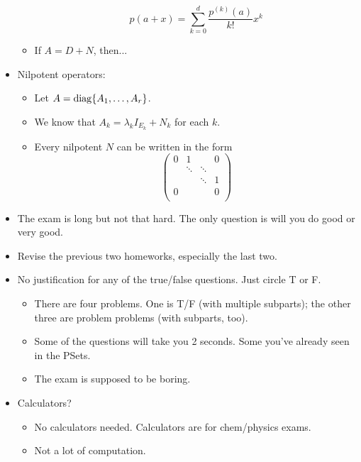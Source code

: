 \documentclass[../../notes.tex]{subfiles}
\begin{document}
\begin{itemize}
\begin{itemize}
        \begin{equation*}
            p(a+x) = \sum_{k=0}^d\frac{p^{(k)}(a)}{k!}x^k
        \end{equation*}
        \item If $A=D+N$, then...
    \end{itemize}
    \item Nilpotent operators:
    \begin{itemize}
        \item Let $A=\operatorname{diag}\{A_1,\dots,A_r\}$.
        \item We know that $A_k=\lambda_kI_{E_k}+N_k$ for each $k$.
        \item Every nilpotent $N$ can be written in the form
        \begin{equation*}
            \begin{pmatrix}
                0 & 1 &  & 0\\
                 & \ddots & \ddots & \\
                 &  & \ddots & 1\\
                0 &  &  & 0\\
            \end{pmatrix}
        \end{equation*}
    \end{itemize}
    \item {}The exam is long but not that hard. The only question is will you do good or very good.
    \item Revise the previous two homeworks, especially the last two.
    \item No justification for any of the true/false questions. Just circle T or F.
    \begin{itemize}
        \item There are four problems. One is T/F (with multiple subparts); the other three are problem problems (with subparts, too).
        \item Some of the questions will take you 2 seconds. Some you've already seen in the PSets.
        \item The exam is supposed to be boring.
    \end{itemize}
    \item Calculators?
    \begin{itemize}
        \item No calculators needed. Calculators are for chem/physics exams.
        \item Not a lot of computation.
    \end{itemize}

\end{itemize}
\end{document}
